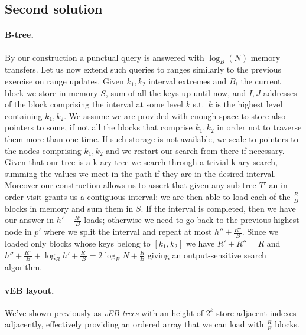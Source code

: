 
\subsection{Second solution}

\paragraph{B-tree.} By our construction a punctual query is answered with $\log_B(N)$ memory transfers.
Let us now extend such queries to ranges similarly to the previous exercise on range updates.
Given $k_1, k_2$ interval extremes and $B_i$ the current block we store in memory $S$, sum of all the keys up until now, and $I, J$ addresses of the block comprising the interval at some level $k$ s.t.\ $k$ is the highest level containing $k_1, k_2$.
We assume we are provided with enough space to store also pointers to some, if not all the blocks that comprise $k_1, k_2$ in order not to traverse them more than one time.
If such storage is not available, we scale to pointers to the nodes comprising $k_1, k_2$ and we restart our search from there if necessary.
Given that our tree is a k-ary tree we search through a trivial k-ary search, summing the values we meet in the path if they are in the desired interval.
Moreover our construction allows us to assert that given any sub-tree $T'$ an in-order visit grants us a contiguous interval: we are then able to load each of the $\frac{R}{B}$ blocks in memory and sum them in $S$.
If the interval is completed, then we have our answer in $h' + \frac{R'}{B}$ loads; otherwise we need to go back to the previous highest node in $p'$ where we split the interval and repeat at most $h'' + \frac{R''}{B}$.
Since we loaded only blocks whose keys belong to $[k_1, k_2]$ we have $R' + R'' = R$ and $h'' + \frac{R''}{B} + \log_B{h'} + \frac{R'}{B} = 2\log_B{N} + \frac{R}{B}$ giving an output-sensitive search algorithm.

\paragraph{vEB layout.} We've shown previously as \emph{vEB trees} with an height of $2^k$ store adjacent indexes adjacently, effectively providing an ordered array that we can load with $\frac{R}{B}$ blocks.

